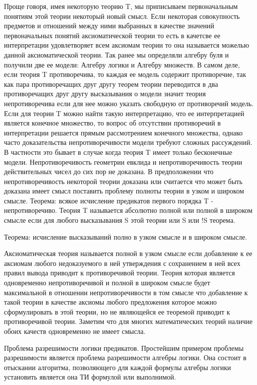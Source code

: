Проще говоря, имея некоторую теорию T, мы приписываем первоначальным понятиям этой теории некоторый новый смысл. Если некоторая совокупность предметов и отношений между ними выбранных в качестве значений первоначальных понятий аксиоматической теории то есть в качетсве ее интерпретации удовлетворяет всем аксиомам теории то она называется можелью данной аксиоматической теории. Так ранее мы определяли алгебру буля и получили две ее модели: Алгебру логики и Алгебру множеств. В самом деле, если теория T противоречива, то каждая ее модель содержит противоречие, так как пара противоречащих друг другу теорем теории переводится в два противоречащих друг другу высказывания о модели значит теория непротиворечива если для нее можно указать свободную от противоречий модель. Если для теории T можно найти такую интерпретацию, что ее интерпретацией является конечное множество, то вопрос об отсутствии противоречий в интерпретации решается прямым рассмотрением конечного множества, однако часто доказательства непротиворечивости модели требуют сложных рассуждений. В частности это бывает в случае когда теория T имеет только бесконечные модели. Непротиворечивость геометрии евклида и непротиворечивость теории действительных чисел до сих пор не доказана. В предположении что непротиворечивость некоторой теории доказана или считается что может быть доказана имеет смысл поставить проблему полноты теории в узком и широком смысле. Теорема: всякое исчисление предикатов первого порядка T - непротиворечиво. Теория T называется абсолютно полной или полной в широком смысле если для любого высказывания S этой теории или S или !S теорема.

Теорема:
исчисление высказываний полно в узком смысле и в широком смысле.

Аксиоматическая теория называется полной в узком смысле если добавление к ее аксиомам любого недоказуемого в ней утверждения с сохранением в ней всех правил вывода приводит к противоречивой теории. Теория которая является одновременно непротиворечивой и полной в широком смысле будет максимальной в отношении непротиворечивости в том смысле что добавление к такой теории в качестве аксиомы любого предложения которое можно сформулировать в этой теории, но не являющейся ее теоремой приводит к противоречивой теории. Заметим что для многих математических теорий наличие обоих качеств одновременно не имеет смысла.

Проблема разрешимости логики предикатов. Простейшим примером проблемы разрешимости является проблема разрешимости алгебры логики. Она состоит в отыскании алгоритма, позволяющего для каждой формулы алгебры логики установить является она ТИ формулой или выполнимой.

